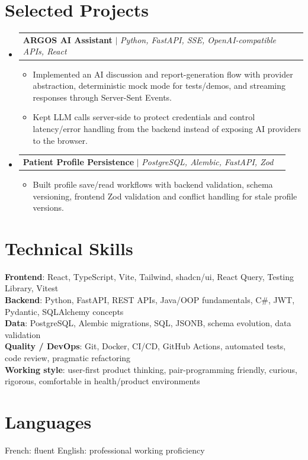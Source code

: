 \documentclass[letterpaper,11pt]{article}
\makeatletter
\newcommand{\resumeItem}[1]{\item\small{#1 \vspace{-2pt}}}
\newcommand{\resumeProjectHeading}[2]{
    \item
    \begin{tabular*}{0.97\textwidth}{l@{\extracolsep{\fill}}r}
      \small#1 & #2 \\
    \end{tabular*}\vspace{-7pt}
}
\newcommand{\resumeSubHeadingListStart}{\begin{itemize}[leftmargin=0.15in, label={}]}
\newcommand{\resumeSubHeadingListEnd}{\end{itemize}}
\newcommand{\resumeItemListStart}{\begin{itemize}[leftmargin=0.18in]}
\newcommand{\resumeItemListEnd}{\end{itemize}\vspace{-5pt}}
\makeatother
\begin{document}
\section{Selected Projects}
\resumeSubHeadingListStart
  \resumeProjectHeading
    {\textbf{ARGOS AI Assistant} $|$ \emph{Python, FastAPI, SSE, OpenAI-compatible APIs, React}}{}
    \resumeItemListStart
      \resumeItem{Implemented an AI discussion and report-generation flow with provider abstraction, deterministic mock mode for tests/demos, and streaming responses through Server-Sent Events.}
      \resumeItem{Kept LLM calls server-side to protect credentials and control latency/error handling from the backend instead of exposing AI providers to the browser.}
    \resumeItemListEnd
  \resumeProjectHeading
    {\textbf{Patient Profile Persistence} $|$ \emph{PostgreSQL, Alembic, FastAPI, Zod}}{}
    \resumeItemListStart
      \resumeItem{Built profile save/read workflows with backend validation, schema versioning, frontend Zod validation and conflict handling for stale profile versions.}
    \resumeItemListEnd
\resumeSubHeadingListEnd

\section{Technical Skills}
\begin{itemize}[leftmargin=0.15in, label={}]
  \small{\item{
    \textbf{Frontend}{: React, TypeScript, Vite, Tailwind, shadcn/ui, React Query, Testing Library, Vitest} \\
    \textbf{Backend}{: Python, FastAPI, REST APIs, Java/OOP fundamentals, C\#, JWT, Pydantic, SQLAlchemy concepts} \\
    \textbf{Data}{: PostgreSQL, Alembic migrations, SQL, JSONB, schema evolution, data validation} \\
    \textbf{Quality / DevOps}{: Git, Docker, CI/CD, GitHub Actions, automated tests, code review, pragmatic refactoring} \\
    \textbf{Working style}{: user-first product thinking, pair-programming friendly, curious, rigorous, comfortable in health/product environments}
  }}
\end{itemize}

\section{Languages}
\small{French: fluent \quad English: professional working proficiency}
\end{document}

